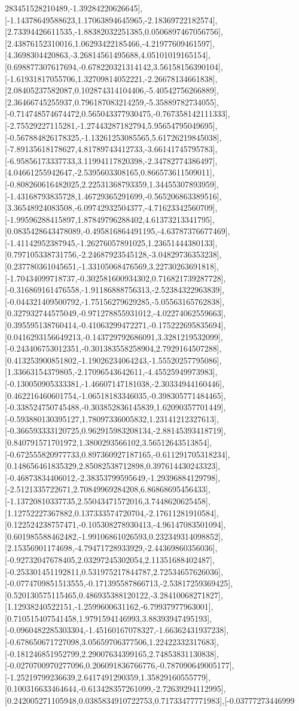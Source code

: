 \documentclass{article}
\begin{document}
283451528210489,-1.39284220626645],[-1.14378649588623,1.17063894645965,-2.18369722182574],[2.73394426611535,-1.88382032251385,0.0506897467056756],[2.43876152310016,1.06293422185466,-4.21977609461597],[4.3698304420863,-3.26814561495688,4.05101019165154],[0.698877307617694,-0.678220321314142,3.56158156390104],[-1.61931817055706,1.32709814052221,-2.26678134661838],[2.08405237582087,0.102874314104406,-5.40542756266889],[2.36466745255937,0.796187083214259,-5.35889782734055],[-0.714748574674472,0.565043377930475,-0.767358142111333],[-2.75529227115281,-1.27443287182794,5.95654795049695],[-0.567884826178325,-1.13261253085565,5.61726219845038],[-7.89135618178627,4.81789743412733,-3.66141745795783],[-6.95856173337733,3.11994117820398,-2.34782774386497],[4.04661255942647,-2.5395603308165,0.866573611509011],[-0.808260616482025,2.22531368793359,1.34455307893959],[-1.43168793835728,1.46729365291699,-0.565206863389516],[3.36548924083508,-6.09742932504377,-4.71623342560709],[-1.99596288415897,1.87849796288402,4.61373213341795],[0.0835428643478089,-0.495816864491195,-4.63787376677469],[-1.41142952387945,-1.26276057891025,1.23651444380133],[0.797105338731756,-2.24687923545128,-3.04829736353238],[0.237780361045651,-1.33105068476569,3.22730263691818],[-1.70434099718737,-0.302581600934302,0.716821739287728],[-0.316869161476558,-1.91186888756313,-2.52384322963839],[-0.044321409500792,-1.75156279629285,-5.05563165762838],[0.327932744575049,-0.971278855931012,-4.02274062559663],[0.395595138760414,-0.41063299472271,-0.175222695835694],[0.0416293156649213,-0.143729792686091,3.3281219532099],[-0.243406753012351,-0.301383558258904,2.7929164507288],[0.413253900851802,-1.19026234064243,-1.55520257795086],[1.33663154379805,-2.17096543642611,-4.45525949973983],[-0.130050905333381,-1.46607147181038,-2.30334944160446],[0.462216460601754,-1.06518183346035,-0.398305771484465],[-0.338524750745488,-0.303852836145839,1.62090357701449],[-0.593880130395127,1.78097336005832,1.23141212327613],[-0.366593333120725,0.962915983208134,-2.88145393418719],[0.840791571701972,1.3800293566102,3.56512643513854],[-0.672555820977733,0.897360927187165,-0.611291705318234],[0.148656461835329,2.85082538712898,0.397614430243323],[-0.46873834406012,-2.38353799595649,-1.29396884129798],[-2.5121335722671,2.70849969284208,6.86868695456433],[-1.13720810337735,2.55043471572016,3.7448620625458],[1.12752227367882,0.137333574720704,-2.17611281910584],[0.122524238757471,-0.105308278930413,-4.96147083501094],[0.601985588462482,-1.99106861026593,0.232349314098852],[2.15356901174698,-4.79471728933929,-2.44369860356036],[-0.92732047678405,2.03297245302054,2.11351688402487],[-0.253301451192811,0.531975217844787,2.72534657626036],[-0.0774709851513555,-0.171395587866713,-2.53817259369425],[0.520130575115465,0.486935388120122,-3.28410068271827],[1.12938240522151,-1.2599600631162,-6.79937977963001],[0.710515407541458,1.9791594146993,3.88393947495193],[-0.0960482285303304,-1.45160167078327,-1.66362431937238],[-0.678650671727098,3.05659706377506,1.22422332317683],[-0.181246851952799,2.29007634399165,2.74853831130838],[-0.0270700970277096,0.206091836766776,-0.787090649005177],[-1.25219799236639,2.6417491290359,1.35829160555779],[0.100316633464644,-0.613428357261099,-2.72639294112995],[0.242005271105948,0.0385834910722753,0.71733477771983],[-0.03777273446999
\end{document}
